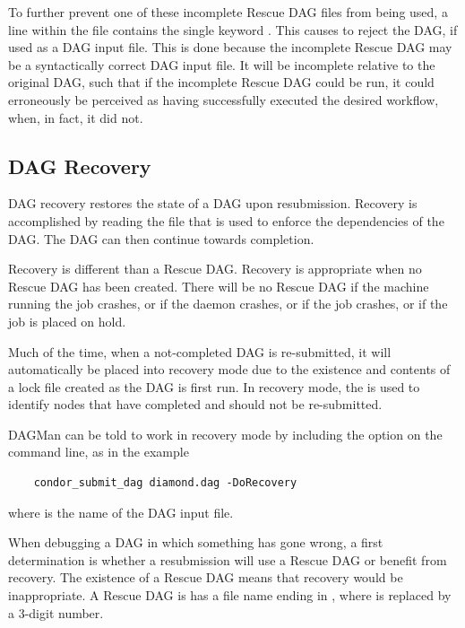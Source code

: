 To further prevent one of these incomplete Rescue DAG files from being used,
a line within the file contains the single keyword .
This causes  to reject the DAG, if used as a DAG input file.
This is done because the
incomplete Rescue DAG may be a syntactically correct DAG input file.
It will be incomplete relative to the original DAG,
such that if the incomplete Rescue DAG could be run,
it could erroneously be perceived as
having successfully executed the desired workflow, when, in fact,
it did not.

\subsection{\label{sec:DAGMan-recovery}DAG Recovery}

DAG recovery restores the state of a DAG upon resubmission.
Recovery is accomplished by reading the 
file that is used to enforce the dependencies of the DAG.
The DAG can then continue towards completion.

Recovery is different than a Rescue DAG.
Recovery is appropriate when no Rescue DAG has been created.
There will be no Rescue DAG 
if the machine running the  job crashes,
or if the  daemon crashes,
or if the  job crashes,
or if the  job is placed on hold.

Much of the time, when a not-completed DAG is re-submitted,
it will automatically be placed into recovery mode
due to the existence and contents of a lock file created as the DAG
is first run.
In recovery mode, the  is used to identify
nodes that have completed and should not be re-submitted.

DAGMan can be told to work in recovery mode by including the
 option on the command line, as in the example
\begin{verbatim}
    condor_submit_dag diamond.dag -DoRecovery
\end{verbatim}
where  is the name of the DAG input file.

When debugging a DAG in which something has gone wrong,
a first determination is whether a resubmission will
use a Rescue DAG or benefit from recovery.
The existence of a Rescue DAG means that recovery would be inappropriate.
A Rescue DAG is has a file name ending in ,
where  is replaced by a 3-digit number.

